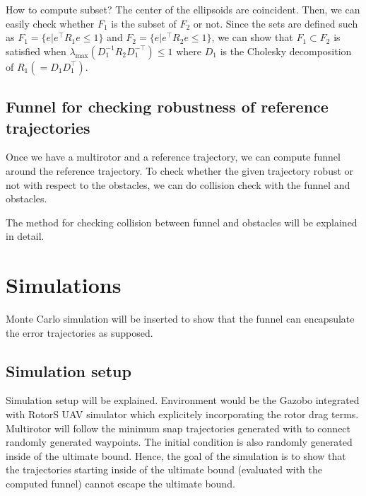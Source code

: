 \documentclass[letterpaper, 10 pt, conference]{ieeeconf}  %
\begin{document}
How to compute subset?
The center of the ellipsoids are coincident. Then, we can easily check whether $F_1$ is the subset of $F_2$ or not.
Since the sets are defined such as $F_1 = \{e|e^\top R_1 e \leq 1\}$ and $F_2 = \{e|e^\top R_2 e \leq 1\}$, we can show that $F_1 \subset F_2$ is satisfied when $\lambda_{\max}(D_1^{-1}R_2D_1^{-\top} )\leq 1$ where $D_1$ is the Cholesky decomposition of $R_1( = D_1D_1^\top)$.

\subsection{Funnel for checking robustness of reference trajectories}
Once we have a multirotor and a reference trajectory, we can compute funnel around the reference trajectory. 
To check whether the given trajectory robust or not with respect to the obstacles, we can do collision check with the funnel and obstacles.

The method for checking collision between funnel and obstacles will be explained in detail.


\section{Simulations}
Monte Carlo simulation will be inserted to show that the funnel can encapsulate the error trajectories as supposed. 
\subsection{Simulation setup}
Simulation setup will be explained. Environment would be the Gazobo integrated with RotorS UAV simulator which explicitely incorporating the rotor drag terms.
Multirotor will follow the minimum snap trajectories generated with to connect randomly generated waypoints.
The initial condition is also randomly generated inside of the ultimate bound. 
Hence, the goal of the simulation is to show that the trajectories starting inside of the ultimate bound (evaluated with the computed funnel) cannot escape the ultimate bound.
\end{document}
